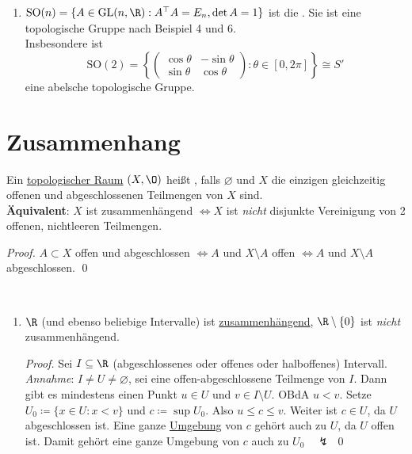 \begin{example}
\begin{enumerate}
    \item \( \text{SO}(n) = \{ A \in \text{GL}(n,\R) : A^\top A = E_n, \det A = 1 \} \) ist die . Sie ist eine topologische Gruppe nach Beispiel 4 und 6. \\
      Insbesondere ist
      \begin{equation*}
        \text{SO}(2) = \left \{ \begin{pmatrix}
          \cos \theta & -\sin \theta \\
          \sin \theta & \cos \theta
        \end{pmatrix} : \theta \in [0, 2\pi] \right \} \cong S'
      \end{equation*}
      eine abelsche topologische Gruppe.
  \end{enumerate}
\end{example}

\section{Zusammenhang}

\begin{definition}[Zusammenhängend]\label{def:zusammenhaengend}
  Ein \hyperref[def:topologie]{topologischer Raum} \( (X, \O) \) heißt , falls \( \varnothing \) und \( X \) die einzigen gleichzeitig offenen und abgeschlossenen Teilmengen von \( X \) sind. \\
  \textbf{Äquivalent}: \( X \) ist zusammenhängend \( \Leftrightarrow X \) ist \emph{nicht} disjunkte Vereinigung von 2 offenen, nichtleeren Teilmengen.
  \begin{proof}
    \( A \subset X \) offen und abgeschlossen \( \Leftrightarrow A \) und \( X \setminus A \) offen \( \Leftrightarrow A \) und \( X \setminus A \) abgeschlossen. \qed{}
  \end{proof}
\end{definition}

\begin{example}[Zusammenhang]
  \
  \begin{enumerate}
    \item \( \R \) (und ebenso beliebige Intervalle) ist \hyperref[def:zusammenhaengend]{zusammenhängend}, \( \R \setminus \{ 0 \} \) ist \emph{nicht} zusammenhängend.
    \begin{proof}
      Sei \( I \subseteq \R \) (abgeschlossenes oder offenes oder halboffenes) Intervall. \\
      \emph{Annahme}: \( I \neq U \neq \varnothing \), sei eine offen-abgeschlossene Teilmenge von \( I \). Dann gibt es mindestens einen Punkt \( u \in U \) und \( v \in I \setminus U \). OBdA \( u < v \). Setze \( U_0 \coloneqq \{ x \in U : x < v \} \) und \( c \coloneqq \sup U_0 \). Also \( u \leq c \leq v \). Weiter ist \( c \in U \), da \( U \) abgeschlossen ist. Eine ganze \hyperref[def:umgebung]{Umgebung} von \( c \) gehört auch zu \( U \), da \( U \) offen ist. Damit gehört eine ganze Umgebung von \( c \) auch zu \( U_0 \quad \lightning \) \qed{}
    \end{proof}
  \end{enumerate}
\end{example}

